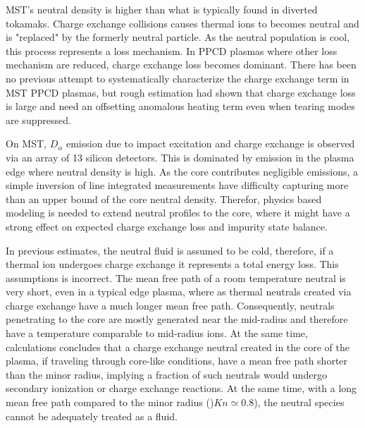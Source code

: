 \documentclass[aip, pop, preprint]{revtex4-1}
\begin{document}
MST's neutral density is higher than what is typically found in diverted tokamaks. Charge exchange collisions causes thermal ions to becomes neutral and is "replaced" by the formerly neutral particle. As the neutral population is cool, this process represents a loss mechanism. In PPCD plasmas where other loss mechanism are reduced, charge exchange loss becomes dominant. There has been no previous attempt to systematically characterize the charge exchange term in MST PPCD plasmas, but rough estimation had shown that charge exchange loss is large and need an offsetting anomalous heating term even when tearing modes are suppressed\cite{BiewerThesis}.

On MST, $D_{\alpha}$ emission due to impact excitation and charge exchange is observed via an array of 13 silicon detectors. This is dominated by emission in the plasma edge where neutral density is high. As the core contributes negligible emissions, a simple inversion of line integrated measurements have difficulty capturing more than an upper bound of the core neutral density. Therefor, physics based modeling is needed to extend neutral profiles to the core, where it might have a strong effect on expected charge exchange loss and impurity state balance.

In previous estimates, the neutral fluid is assumed to be cold, therefore, if a thermal ion undergoes charge exchange it represents a total energy loss. This assumptions is incorrect. The mean free path of a room temperature neutral is very short, even in a typical edge plasma, where as thermal neutrals created via charge exchange have a much longer mean free path. Consequently, neutrals penetrating to the core are mostly generated near the mid-radius and therefore have a temperature comparable to mid-radius ions. At the same time, calculations concludes that a charge exchange neutral created in the core of the plasma, if traveling through core-like conditions, have a mean free path shorter than the minor radius, implying a fraction of such neutrals would undergo secondary ionization or charge exchange reactions.  At the same time, with a long mean free path compared to the minor radius ()$Kn \simeq 0.8$), the neutral species cannot be adequately treated as a fluid. 
\end{document}

